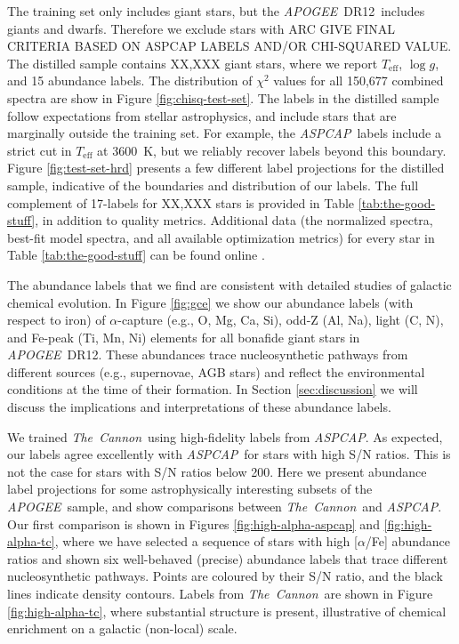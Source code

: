 \documentclass[12pt,preprint]{aastex}
\newcommand{\project}[1]{\textsl{#1}}
\newcommand{\TheCannon}{\project{The~Cannon}}
\newcommand{\acronym}[1]{{\small{#1}}}
\newcommand{\apogee}{\project{\acronym{APOGEE}}}
\newcommand{\aspcap}{\project{\acronym{ASPCAP}}}
\newcommand{\dr}{\acronym{DR12}}
\newcommand{\logg}{\log g}
\newcommand{\Teff}{T_{\mathrm{eff}}}
\begin{document}
The training set only includes giant stars, but the \apogee\ \dr\ includes 
giants and dwarfs.  Therefore we exclude stars with 
ARC GIVE FINAL CRITERIA BASED ON ASPCAP LABELS AND/OR CHI-SQUARED VALUE.
The distilled sample contains XX,XXX giant stars, where we report $\Teff$,
$\logg$, and 15 abundance labels.  The distribution of $\chi^2$ values for
all 150,677 combined spectra are show in Figure \ref{fig:chisq-test-set}.  The
labels in the distilled sample follow expectations from stellar astrophysics,
and include stars that are marginally outside the training set.  For example,
the \aspcap\ labels include a strict cut in $\Teff$ at 3600~K, but we reliably
recover labels beyond this boundary.  Figure \ref{fig:test-set-hrd} presents a
few different label projections for the distilled sample, indicative of the
boundaries and distribution of our labels.  The full complement of 17-labels
for XX,XXX stars is provided in Table \ref{tab:the-good-stuff}, in addition
to quality metrics.  Additional data (the normalized spectra, best-fit model
spectra, and all available optimization metrics) for every star in Table 
\ref{tab:the-good-stuff} can be found online \citet{Zenodo}.



The abundance labels that we find are consistent with detailed studies
of galactic chemical evolution.  In Figure \ref{fig:gce} we show our abundance
labels (with respect to iron) of $\alpha$-capture (e.g., O, Mg, Ca, Si), odd-Z
(Al, Na), light (C, N), and Fe-peak (Ti, Mn, Ni) elements for all bonafide
giant stars in \apogee\ \dr.  These abundances trace nucleosynthetic pathways
from different sources (e.g., supernovae, AGB stars) and reflect the environmental
conditions at the time of their formation.  In Section \ref{sec:discussion} 
we will discuss the implications and interpretations of these abundance
labels.


We trained \TheCannon\ using high-fidelity labels from \aspcap.  As expected,
our labels agree excellently with \aspcap\ for stars with high S/N ratios.
This is not the case for stars with S/N ratios below 200.  Here we present
abundance label projections for some astrophysically interesting subsets of
the \apogee\ sample, and show comparisons between \TheCannon\ and \aspcap.
Our first comparison is shown in Figures \ref{fig:high-alpha-aspcap} and
\ref{fig:high-alpha-tc}, where we have selected a sequence of stars with
high [$\alpha$/Fe] abundance ratios and shown six well-behaved (precise)
abundance labels that trace different nucleosynthetic pathways.  Points are
coloured by their S/N ratio, and the black lines indicate density contours.
Labels from \TheCannon\ are shown in Figure \ref{fig:high-alpha-tc}, where
substantial structure is present, illustrative of chemical enrichment on a
galactic (non-local) scale.
\end{document}
